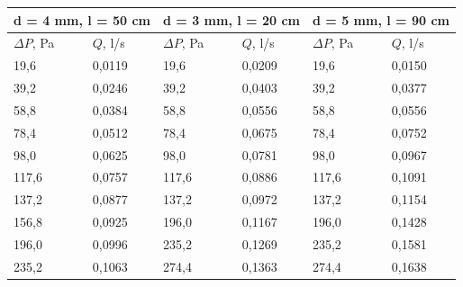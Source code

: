 \documentclass[12pt]{article}
\begin{document}
\begin{table}[H]
	\centering
	\begin{tabular}{|l|l|l|l|l|l|}
		\hline
		\multicolumn{2}{|l|}{d = 4 mm, l = 50 cm}                                & \multicolumn{2}{l|}{d = 3 mm, l = 20 cm}       & \multicolumn{2}{l|}{d = 5 mm, l = 90 cm}       \\ \hline
		 $\Delta P$, Pa & $Q$, l/s & $\Delta P$, Pa & $Q$, l/s & $\Delta P$, Pa & $Q$, l/s \\ \hline
		19,6                                                          & 0,0119   & 19,6                                & 0,0209   & 19,6                                & 0,0150   \\ \hline
		39,2                                                          & 0,0246   & 39,2                                & 0,0403   & 39,2                                & 0,0377   \\ \hline
		58,8                                                          & 0,0384   & 58,8                                & 0,0556   & 58,8                                & 0,0556   \\ \hline
		78,4                                                          & 0,0512   & 78,4                                & 0,0675   & 78,4                                & 0,0752   \\ \hline
		98,0                                                          & 0,0625   & 98,0                                & 0,0781   & 98,0                                & 0,0967   \\ \hline
		117,6                                                         & 0,0757   & 117,6                               & 0,0886   & 117,6                               & 0,1091   \\ \hline
		137,2                                                         & 0,0877   & 137,2                               & 0,0972   & 137,2                               & 0,1154   \\ \hline
		156,8                                                         & 0,0925   & 196,0                               & 0,1167   & 196,0                               & 0,1428   \\ \hline
		196,0                                                         & 0,0996   & 235,2                               & 0,1269   & 235,2                               & 0,1581   \\ \hline
		235,2                                                         & 0,1063   & 274,4                               & 0,1363   & 274,4                               & 0,1638   \\ \hline

\end{tabular}
\end{table}
\end{document}
